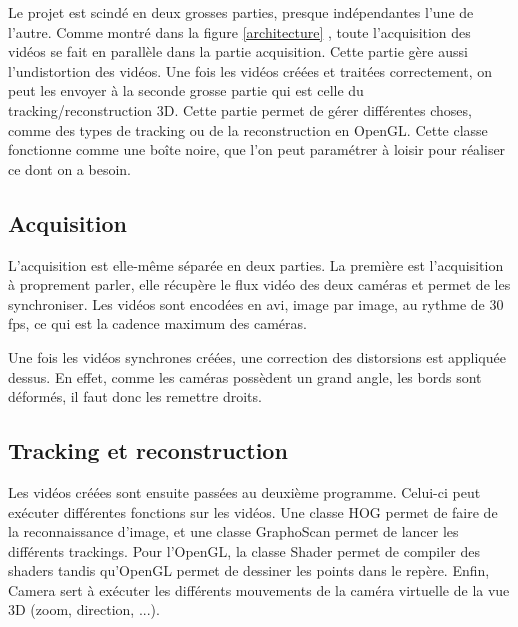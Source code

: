 Le projet est scindé en deux grosses parties, presque indépendantes l'une de l'autre.
Comme montré dans la figure \ref{architecture} , toute l'acquisition des vidéos se fait en parallèle dans la partie acquisition. Cette partie gère aussi l'undistortion des vidéos. Une fois les vidéos créées et traitées correctement, on peut les envoyer à la seconde grosse partie qui est celle du tracking/reconstruction 3D. Cette partie permet de gérer différentes choses, comme des types de tracking ou de la reconstruction en OpenGL. Cette classe fonctionne comme une boîte noire, que l'on peut paramétrer à loisir pour réaliser ce dont on a besoin.

\subsection{Acquisition}
L'acquisition est elle-même séparée en deux parties. La première est l'ac\-qui\-si\-tion à proprement parler, elle récupère le flux vidéo des deux caméras et permet de les synchroniser. Les vidéos sont encodées en avi, image par image, au rythme de 30 fps, ce qui est la cadence maximum des caméras.

Une fois les vidéos synchrones créées, une correction des distorsions est appliquée dessus. En effet, comme les caméras possèdent un grand angle, les bords sont déformés, il faut donc les remettre droits.

\subsection{Tracking et reconstruction}

Les vidéos créées sont ensuite passées au deuxième programme. Celui-ci peut exécuter différentes fonctions sur les vidéos. Une classe HOG permet de faire de la reconnaissance d'image, et une classe GraphoScan permet de lancer les différents trackings. Pour l'OpenGL, la classe Shader permet de compiler des shaders tandis qu'OpenGL permet de dessiner les points dans le repère. Enfin, Camera sert à exécuter les différents mouvements de la caméra virtuelle de la vue 3D (zoom, direction, ...).

